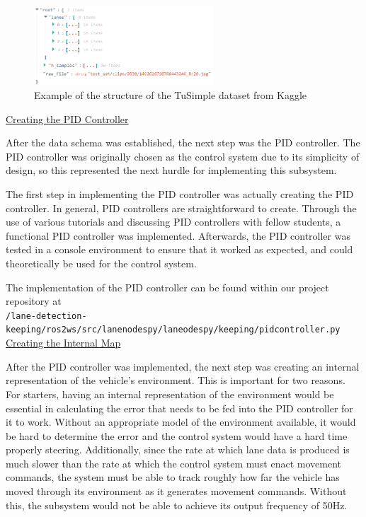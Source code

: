 \documentclass[titlepage,draft]{article}
\begin{document}
{\begin{figure}
	\centering
	\includegraphics[width=0.6\textwidth]{tusimple_data_example}
	\caption{Example of the structure of the TuSimple dataset from Kaggle \cite{tusimpleStructure}}
	\label{fig:tusimple_dataformat}
\end{figure}

\underline{Creating the PID Controller}

After the data schema was established, the next step was the PID controller. The PID controller was originally chosen as the control system due to its simplicity of design, so this represented the next hurdle for implementing this subsystem.

The first step in implementing the PID controller was actually creating the PID controller. In general, PID controllers are straightforward to create. Through the use of various tutorials and discussing PID controllers with fellow students, a functional PID controller was implemented. Afterwards, the PID controller was tested in a console environment to ensure that it worked as expected, and could theoretically be used for the control system.

The implementation of the PID controller can be found within our project
repository at \\\texttt{/lane-detection-keeping/ros2\textunderscore ws/src/lane\textunderscore nodes\textunderscore py/lane\textunderscore odes\textunderscore py/keeping/pid\textunderscore controller.py}
\\

\underline{Creating the Internal Map}

After the PID controller was implemented, the next step was creating an internal representation of the vehicle's environment. This is important for two reasons. For starters, having an internal representation of the environment would be essential in calculating the error that needs to be fed into the PID controller for it to work. Without an appropriate model of the environment available, it would be hard to determine the error and the control system would have a hard time properly steering. Additionally, since the rate at which lane data is produced is much slower than the rate at which the control system must enact movement commands, the system must be able to track roughly how far the vehicle has moved through its environment as it generates movement commands. Without this, the subsystem would not be able to achieve its output frequency of 50Hz.

}
\end{document}
